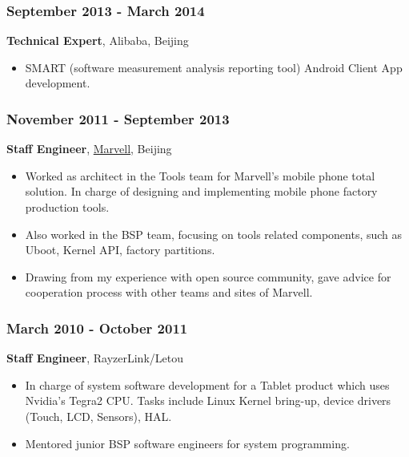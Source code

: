 \documentclass[11pt,dvipdfmx,CJKbookmarks]{article}
\begin{document}
\begin{CJK*}{UTF8}{simsun}
\subsubsection{September 2013 - March 2014}
\label{sec-1-0-2}
\textbf{Technical Expert}, Alibaba, Beijing
\begin{itemize}
\item SMART (software measurement analysis reporting tool) Android
Client App development.
\end{itemize}

\subsubsection{November 2011 - September 2013}
\label{sec-1-0-3}
\textbf{Staff Engineer}, \href{http://marvell.com}{Marvell}, Beijing

\begin{itemize}
\item Worked as architect in the Tools team for Marvell's mobile phone
total solution. In charge of designing and implementing mobile
phone factory production tools.

\item Also worked in the BSP team, focusing on tools related
components, such as Uboot, Kernel API, factory partitions.
\end{itemize}


\begin{itemize}
\item Drawing from my experience with open source community, gave
advice for cooperation process with other teams and sites of
Marvell.
\end{itemize}


\subsubsection{March 2010 - October 2011}
\label{sec-1-0-4}

\textbf{Staff Engineer}, RayzerLink/Letou

\begin{itemize}
\item In charge of system software development for a Tablet product
which uses Nvidia's Tegra2 CPU. Tasks include Linux Kernel
bring-up, device drivers (Touch, LCD, Sensors), HAL.

\item Mentored junior BSP software engineers for system programming.
\end{itemize}


\end{CJK*}
\end{document}
